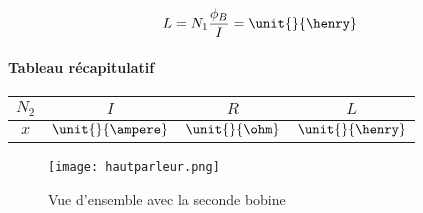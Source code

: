 $$L = N_1 \frac{\phi_B}{I} = \unit{}{\henry}$$

\paragraph{Tableau récapitulatif}

\begin{center}
	\begin{tabular}{c|c|c|c}
		$N_2$ & $I$ & $R$ & $L$ \\
		\hline
		 $x$ & $\unit{}{\ampere}$ & $\unit{}{\ohm}$ & $\unit{}{\henry}$ \\
	\end{tabular}
\end{center}

\begin{figure}[h]
\centering
\texttt{[image: hautparleur.png]}
\caption{Vue d'ensemble avec la seconde bobine}
\label{Vue d'ensemble avec la seconde bobine}
\end{figure}

